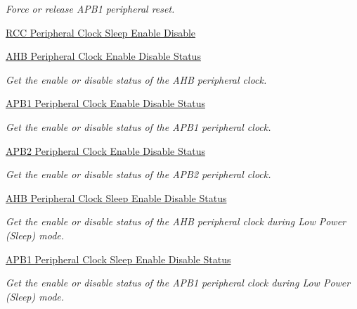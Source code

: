 \begin{DoxyCompactItemize}
\begin{DoxyCompactList}\small\item\em Force or release A\-P\-B1 peripheral reset. \end{DoxyCompactList}\item 
\hyperlink{group___r_c_c___peripheral___clock___sleep___enable___disable}{R\-C\-C Peripheral Clock Sleep Enable Disable}
\item 
\hyperlink{group___r_c_c___a_h_b___peripheral___clock___enable___disable___status}{A\-H\-B Peripheral Clock Enable Disable Status}
\begin{DoxyCompactList}\small\item\em Get the enable or disable status of the A\-H\-B peripheral clock. \end{DoxyCompactList}\item 
\hyperlink{group___r_c_c___a_p_b1___peripheral___clock___enable___disable___status}{A\-P\-B1 Peripheral Clock Enable Disable Status}
\begin{DoxyCompactList}\small\item\em Get the enable or disable status of the A\-P\-B1 peripheral clock. \end{DoxyCompactList}\item 
\hyperlink{group___r_c_c___a_p_b2___peripheral___clock___enable___disable___status}{A\-P\-B2 Peripheral Clock Enable Disable Status}
\begin{DoxyCompactList}\small\item\em Get the enable or disable status of the A\-P\-B2 peripheral clock. \end{DoxyCompactList}\item 
\hyperlink{group___r_c_c___a_h_b___clock___sleep___enable___disable___status}{A\-H\-B Peripheral Clock Sleep Enable Disable Status}
\begin{DoxyCompactList}\small\item\em Get the enable or disable status of the A\-H\-B peripheral clock during Low Power (Sleep) mode. \end{DoxyCompactList}\item 
\hyperlink{group___r_c_c___a_p_b1___clock___sleep___enable___disable___status}{A\-P\-B1 Peripheral Clock Sleep Enable Disable Status}
\begin{DoxyCompactList}\small\item\em Get the enable or disable status of the A\-P\-B1 peripheral clock during Low Power (Sleep) mode. \end{DoxyCompactList}\item 

\end{DoxyCompactItemize}
